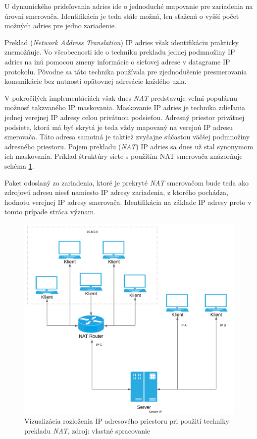 \documentclass[
  digital, %
  table,   %
  lof,     %
  nolot,   %
  nocover
]{fithesis3}
\begin{document}
U dynamického prideľovania adries ide o jednoduché mapovanie pre zariadenia
na úrovni smerovača. Identifikácia je teda stále možná, len sťažená o vyšší
počet možných adries pre jedno zariadenie.

Preklad (\textit{Network Address Translation}) IP adries však identifikáciu
prakticky znemožňuje. Vo všeobecnosti ide o techniku prekladu jednej podmnožiny
IP adries na inú pomocou zmeny informácie o sieťovej adrese v datagrame IP
protokolu. Pôvodne sa táto technika používala pre zjednodušenie presmerovania
komunikácie bez nutnosti opätovnej adresácie každého uzla. 

V pokročilých
implementáciách však dnes \textit{NAT} predstavuje veľmi populárnu možnosť
takzvaného  IP maskovania. Maskovanie IP adries je technika zdieľania jednej
verejnej IP adresy celou privátnou podsieťou. Adresný priestor privátnej
podsiete, ktorá má byť skrytá je teda vždy mapovaný na verejnú IP adresu
smerovača. Táto adresa samotná je taktiež zvyčajne súčasťou väčšej podmnožiny
adresného priestoru. Pojem prekladu (\textit{NAT}) IP adries sa dnes už stal
synonymom ich maskovania. Príklad štruktúry siete s použitím NAT smerovača znázorňuje
schéma \ref{fig:tech-IP-NAT}.

Paket odoslaný zo zariadenia, ktoré je prekryté
\textit{NAT} smerovačom bude teda ako zdrojovú adresu niesť namiesto IP adresy
zariadenia, z ktorého pochádza, hodnotu verejnej IP adresy smerovača.
Identifikácia na základe IP adresy preto v tomto prípade stráca význam.

\begin{figure}[H]
  \centering
    \includegraphics[width=.93\textwidth]{images/tech-IP-NAT.png}
  \caption{Vizualizácia rozloženia IP adresového priestoru pri použití techniky
  prekladu \textit{NAT}, zdroj: vlastné spracovanie}
  \label{fig:tech-IP-NAT}
\end{figure}
\end{document}
